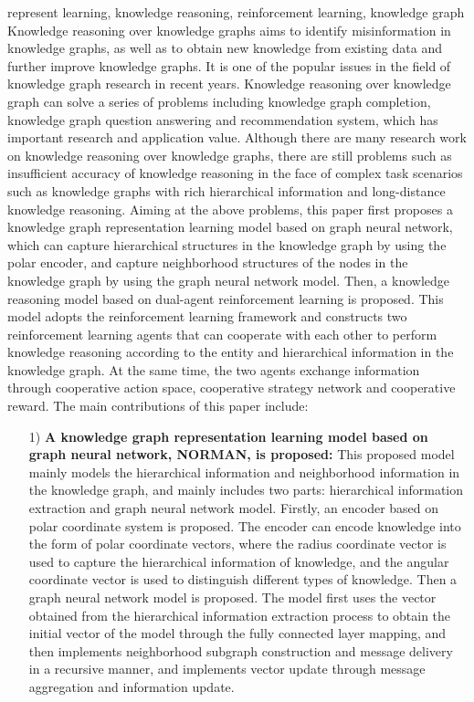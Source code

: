 \documentclass[algorithmlist, AutoFakeBold, AutoFakeSlant, figurelist, tablelist, nomlist, engineering]{seuthesix}
\begin{document}
\begin{englishabstract}{represent learning, knowledge reasoning, reinforcement learning, knowledge graph}
  Knowledge reasoning over knowledge graphs aims to identify misinformation in knowledge graphs, as well as to obtain new knowledge from existing data and further improve knowledge graphs. It is one of the popular issues in the field of knowledge graph research in recent years.
  Knowledge reasoning over knowledge graph can solve a series of problems including knowledge graph completion, knowledge graph question answering and recommendation system, which has important research and application value.
  Although there are many research work on knowledge reasoning over knowledge graphs, there are still problems such as insufficient accuracy of knowledge reasoning in the face of complex task scenarios such as knowledge graphs with rich hierarchical information and long-distance knowledge reasoning. 
  Aiming at the above problems, this paper first proposes a knowledge graph representation learning model based on graph neural network, which can capture hierarchical structures in the knowledge graph by using the polar encoder, and capture neighborhood structures of the nodes in the knowledge graph by using the graph neural network model.
  Then, a knowledge reasoning model based on dual-agent reinforcement learning is proposed. This model adopts the reinforcement learning framework and constructs two reinforcement learning agents that can cooperate with each other to perform knowledge reasoning according to the entity and hierarchical information in the knowledge graph. At the same time, the two agents exchange information through cooperative action space, cooperative strategy network and cooperative reward.
  The main contributions of this paper include:
  \begin{itemize}
    \item [1)]\textbf{A knowledge graph representation learning model based on graph neural network, NORMAN, is proposed:}
    This proposed model mainly models the hierarchical information and neighborhood information in the knowledge graph, and mainly includes two parts: hierarchical information extraction and graph neural network model.
    Firstly, an encoder based on polar coordinate system is proposed. The encoder can encode knowledge into the form of polar coordinate vectors, where the radius coordinate vector is used to capture the hierarchical information of knowledge, and the angular coordinate vector is used to distinguish different types of knowledge.
    Then a graph neural network model is proposed. The model first uses the vector obtained from the hierarchical information extraction process to obtain the initial vector of the model through the fully connected layer mapping, and then implements neighborhood subgraph construction and message delivery in a recursive manner, and implements vector update through message aggregation and information update.

\end{itemize}
\end{englishabstract}
\end{document}

